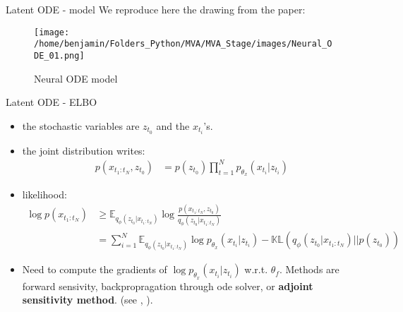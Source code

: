 \begin{frame}{Latent ODE - model}
    We reproduce here the drawing from the paper:
    \begin{figure}[H]
        \centering
        \texttt{[image: /home/benjamin/Folders\_Python/MVA/MVA\_Stage/images/Neural\_ODE\_01.png]}
        \caption{Neural ODE model}
        \label{fig:Neural ODE}
    \end{figure}
\end{frame}

\begin{frame}{Latent ODE - ELBO}
    \begin{itemize}
        \item the stochastic variables are $z_{t_0}$ and the $x_{t_i}$'s.
        \item the joint distribution writes:
            \begin{align}
                p(x_{t_1:t_N}, z_{t_0}) 
                &= p(z_{t_0}) \prod_{t=1}^{N}p_{\theta_x}(x_{t_i} \vert z_{t_i})
            \end{align}
        \item likelihood:
        \begin{align}
            \log{p(x_{t_1:t_N})} 
            &\geq \mathbb{E}_{q_{\phi}(z_{t_0} \vert x_{t_1:t_N})} \log{\frac{p(x_{t_1:t_N}, z_{t_0})}{q_{\phi}(z_{t_0}\vert x_{t_1:t_N})}} \\
                &= \sum_{i=1}^{N} \mathbb{E}_{q_{\phi}(z_{t_0} \vert x_{t_1:t_N})} \log{p_{\theta_x}(x_{t_i} \vert z_{t_i})} - \mathbb{KL}(q_{\phi}(z_{t_0} \vert x_{t_1:t_N}) \vert\vert p(z_{t_0}))
        \end{align}
        \item Need to compute the gradients of $\log{p_{\theta_x}(x_{t_i} \vert z_{t_i})}$ w.r.t. $\theta_f$. 
        Methods are forward sensivity, backpropragation through \gls{ode} solver, or \textbf{adjoint sensitivity method}.
        (see \cite{pontriagin_mathematical_2018}, \cite{sengupta_efficient_2014}).
    \end{itemize}
\end{frame}

